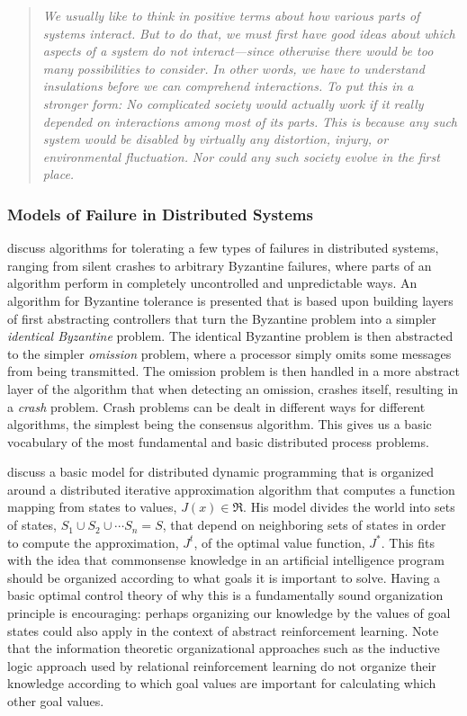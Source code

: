 \begin{quotation}
  \emph{We usually like to think in positive terms about how various parts of systems interact.}
  \emph{But to do that, we must first have good ideas about which aspects of a system do \emph{not} interact---since otherwise there would be too many possibilities to consider.}
  \emph{In other words, we have to understand \emph{insulations} before we can comprehend interactions.}
  \emph{To put this in a stronger form: \emph{No complicated society would actually work if it really depended on interactions among most of its parts}.}
  \emph{This is because any such system would be disabled by virtually any distortion, injury, or environmental fluctuation.}
  \emph{Nor could any such society evolve in the first place.}
\end{quotation}  

{}

\subsubsection{Models of Failure in Distributed Systems}

\cite{attiya:2004} discuss algorithms for tolerating a few types of failures in distributed systems, ranging from silent crashes to arbitrary Byzantine failures, where parts of an algorithm perform in completely uncontrolled and unpredictable ways.
An algorithm for Byzantine tolerance is presented that is based upon building layers of first abstracting controllers that turn the Byzantine problem into a simpler \emph{identical Byzantine} problem.
The identical Byzantine problem is then abstracted to the simpler \emph{omission} problem, where a processor simply omits some messages from being transmitted.
The omission problem is then handled in a more abstract layer of the algorithm that when detecting an omission, crashes itself, resulting in a \emph{crash} problem.
Crash problems can be dealt in different ways for different algorithms, the simplest being the consensus algorithm.
This gives us a basic vocabulary of the most fundamental and basic distributed process problems.

\cite{bertsekas:1982} discuss a basic model for distributed dynamic programming that is organized around a distributed iterative approximation algorithm that computes a function mapping from states to values, $J(x){\in}\Re$.
His model divides the world into sets of states, $S_1 \cup S_2 \cup \cdots S_n = S$, that depend on neighboring sets of states in order to compute the approximation, $J^t$, of the optimal value function, $J^*$.
This fits with the idea that commonsense knowledge in an artificial intelligence program should be organized according to what goals it is important to solve.
Having a basic optimal control theory of why this is a fundamentally sound organization principle is encouraging: perhaps organizing our knowledge by the values of goal states could also apply in the context of abstract reinforcement learning.
Note that the information theoretic organizational approaches such as the inductive logic approach used by relational reinforcement learning do not organize their knowledge according to which goal values are important for calculating which other goal values.

